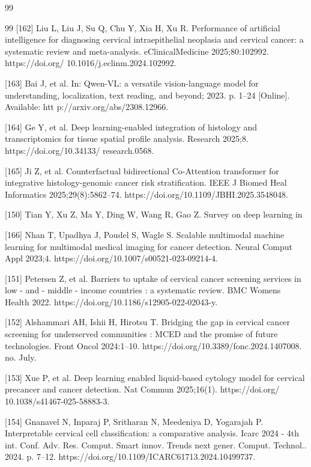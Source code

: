 \documentclass{svjour3}
\begin{document}
\begin{thebibliography}{99}
\begin{thebibliography}{99}
 [162] Liu L, Liu J, Su Q, Chu Y, Xia H, Xu R. Performance of artificial intelligence for diagnosing cervical intraepithelial neoplasia and cervical cancer: a systematic review and meta-analysis. eClinicalMedicine 2025;80:102992. https://doi.org/ 10.1016/j.eclinm.2024.102992.

 [163] Bai J, et al. In: Qwen-VL: a versatile vision-language model for understanding, localization, text reading, and beyond; 2023. p. 1–24 [Online]. Available: htt p://arxiv.org/abs/2308.12966.

 [164] Ge Y, et al. Deep learning-enabled integration of histology and transcriptomics for tissue spatial profile analysis. Research 2025;8. https://doi.org/10.34133/ research.0568.

 [165] Ji Z, et al. Counterfactual bidirectional Co-Attention transformer for integrative histology-genomic cancer risk stratification. IEEE J Biomed Heal Informatics 2025;29(8):5862–74. https://doi.org/10.1109/JBHI.2025.3548048.

 [150] Tian Y, Xu Z, Ma Y, Ding W, Wang R, Gao Z. Survey on deep learning in

 [166] Nhan T, Upadhya J, Poudel S, Wagle S. Scalable multimodal machine learning for multimodal medical imaging for cancer detection. Neural Comput Appl 2023;4. https://doi.org/10.1007/s00521-023-09214-4.

 [151] Petersen Z, et al. Barriers to uptake of cervical cancer screening services in low - and - middle - income countries : a systematic review. BMC Womens Health 2022. https://doi.org/10.1186/s12905-022-02043-y.

 [152] Alshammari AH, Ishii H, Hirotsu T. Bridging the gap in cervical cancer screening for underserved communities : MCED and the promise of future technologies. Front Oncol 2024:1–10. https://doi.org/10.3389/fonc.2024.1407008. no. July.

 [153] Xue P, et al. Deep learning enabled liquid-based cytology model for cervical precancer and cancer detection. Nat Commun 2025;16(1). https://doi.org/ 10.1038/s41467-025-58883-3.

 [154] Gnanavel N, Inparaj P, Sritharan N, Meedeniya D, Yogarajah P. Interpretable cervical cell classification: a comparative analysis. Icarc 2024 - 4th int. Conf. Adv. Res. Comput. Smart innov. Trends next gener. Comput. Technol.. 2024. p. 7–12. https://doi.org/10.1109/ICARC61713.2024.10499737.


\end{thebibliography}
\end{thebibliography}
\end{document}
